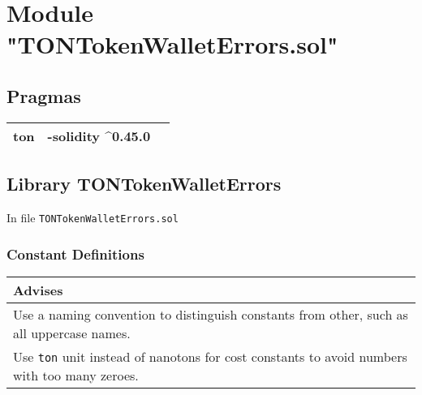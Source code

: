 
\section{Module "TONTokenWalletErrors.sol"}


\subsection{Pragmas}


\noindent\begin{tabular}{|l|l|p{5cm}|}\hline
ton & -solidity \^{}0.45.0 &\\\hline
\end{tabular}


\subsection{Library TONTokenWalletErrors}


In file {\tt TONTokenWalletErrors.sol}

\subsubsection{Constant Definitions}


\ifsoldraft
\noindent\begin{tabular}{|p{12cm}|}\hline
\rowcolor{green}Advises
\\\hline
Use a naming convention to distinguish constants from other, such as all uppercase names.
\\\hline
Use \verb+ton+ unit instead of nanotons for cost constants to avoid numbers with too many zeroes.
\\\hline\end{tabular}
\fi

